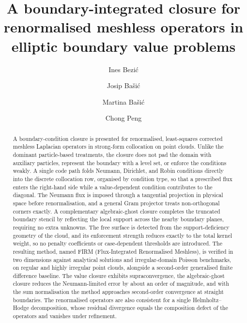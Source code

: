 \documentclass[preprint,review,12pt]{elsarticle}
\begin{document}
\begin{frontmatter}

\title{A boundary-integrated closure for renormalised meshless operators in elliptic boundary value problems}

\author[a]{Ines Bezić}
\author[a]{Josip Bašić}
\author[a]{Martina Bašić}
\author[b]{Chong Peng}
\address[a]{Faculty of Electrical Engineering, Mechanical Engineering and Naval Architecture, University of Split, 21000 Split, Croatia}
\address[b]{School of Civil Engineering, Southeast University, 211189 Nanjing, China}

\begin{abstract}
A boundary-condition closure is presented for renormalised, least-squares corrected meshless Laplacian operators in strong-form collocation on point clouds.
Unlike the dominant particle-based treatments, the closure does not pad the domain with auxiliary particles, represent the boundary with a level set, or enforce the conditions weakly.
A single code path folds Neumann, Dirichlet, and Robin conditions directly into the discrete collocation row, organised by condition type, so that a prescribed flux enters the right-hand side while a value-dependent condition contributes to the diagonal.
The Neumann flux is imposed through a tangential projection in physical space before renormalisation, and a general Gram projector treats non-orthogonal corners exactly.
A complementary algebraic-ghost closure completes the truncated boundary stencil by reflecting the local support across the nearby boundary planes, requiring no extra unknowns.
The free surface is detected from the support-deficiency geometry of the cloud, and its enforcement strength reduces exactly to the total kernel weight, so no penalty coefficients or case-dependent thresholds are introduced.
The resulting method, named FIRM (Flux-Integrated Renormalised Meshless), is verified in two dimensions against analytical solutions and irregular-domain Poisson benchmarks, on regular and highly irregular point clouds, alongside a second-order generalised finite difference baseline.
The value closure exhibits supraconvergence, the algebraic-ghost closure reduces the Neumann-limited error by about an order of magnitude, and with the sum normalisation the method approaches second-order convergence at straight boundaries.
The renormalised operators are also consistent for a single Helmholtz--Hodge decomposition, whose residual divergence equals the composition defect of the operators and vanishes under refinement.
\end{abstract}


\end{frontmatter}
\end{document}
